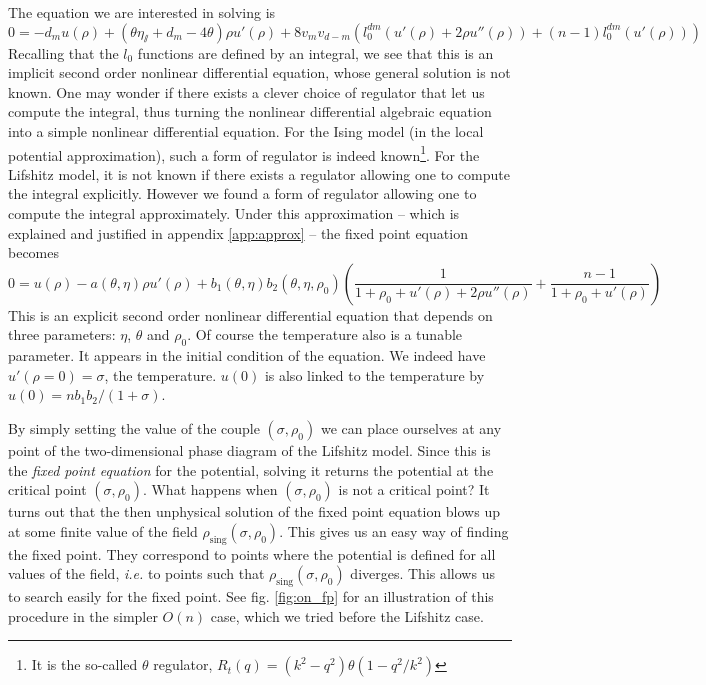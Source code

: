 The equation we are interested in solving is 
\begin{equation}
0 = -d_m u(\rho) +(\theta \eta_\sslash + d_m - 4 \theta) \rho u'(\rho) + 8 v_m v_{d-m} \left( l_0^{dm}\left(u'(\rho) + 2 \rho u''(\rho) \right) + (n-1)l_0^{dm}\left(u'(\rho)\right) \right)
\end{equation}
Recalling that the $l_0$ functions are defined by an integral, we see that this is an implicit second order nonlinear differential equation, whose general solution is not known. One may wonder if there exists a clever choice of regulator that let us compute the integral, thus turning the nonlinear differential algebraic equation into a simple nonlinear differential equation. 
For the Ising model (in the local potential approximation), such a form of regulator is indeed known\footnote{It is the so-called $\theta$ regulator, $R_t(q)= (k^2-q^2) \theta\left(1-q^2/k^2\right)$}. For the Lifshitz model, it is not known if there exists a regulator allowing one to compute the integral explicitly. However we found a form of regulator allowing one to compute the integral approximately. Under this approximation -- which is explained and justified in appendix \eqref{app:approx} -- the fixed point equation becomes
\begin{equation}
\label{eq:u_approx}
0 = u(\rho) - a(\theta, \eta)  \rho u'(\rho) + b_1(\theta, \eta) b_2(\theta, \eta, \rho_0) \left( \frac{1}{1 + \rho_0 + u'(\rho) + 2 \rho u''(\rho)} + \frac{n-1}{1+\rho_0+u'(\rho)} \right)
\end{equation}
This is an explicit second order nonlinear differential equation that depends on three parameters: $\eta$, $\theta$ and $\rho_0$. 
Of course the temperature also is a tunable parameter. It appears in the initial condition of the equation. We indeed have $u'(\rho=0) = \sigma$, the temperature. $u(0)$ is also linked to the temperature by $u(0) = n b_1 b_2/(1+\sigma)$.

By simply setting the value of the couple $(\sigma, \rho_0)$ we can place ourselves at any point of the two-dimensional phase diagram of the Lifshitz model.
Since this is the \textit{fixed point equation} for the potential, solving it returns the potential at the critical point $(\sigma, \rho_0)$. What happens when $(\sigma, \rho_0)$ is not a critical point? It turns out that the then unphysical solution of the fixed point equation blows up at some finite value of the field $\rho_{\text{sing}}(\sigma, \rho_0)$. 
This gives us an easy way of finding the fixed point. They correspond to points where the potential is defined for all values of the field, \textit{i.e.} to points such that $\rho_{\text{sing}}(\sigma, \rho_0)$ diverges. This allows us to search easily for the fixed point. See fig. \eqref{fig:on_fp} for an illustration of this procedure in the simpler $O(n)$ case, which we tried before the Lifshitz case. 

